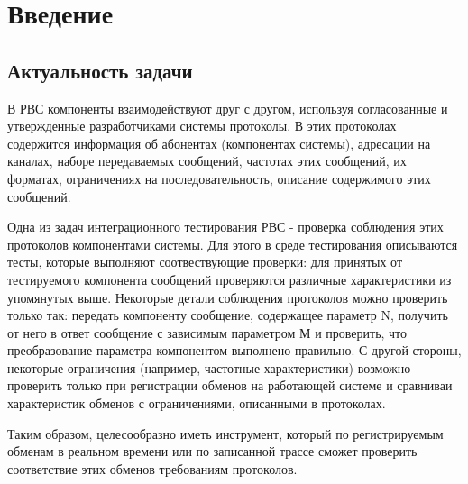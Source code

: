 \section{Введение}

\subsection{Актуальность задачи}


В РВС компоненты взаимодействуют друг с другом, используя согласованные и 
утвержденные разработчиками системы протоколы. В этих протоколах содержится 
информация об абонентах (компонентах системы), адресации на каналах, наборе 
передаваемых сообщений, частотах этих сообщений, их форматах, ограничениях на 
последовательность, описание содержимого этих сообщений.

Одна из задач интеграционного тестирования РВС - проверка соблюдения этих 
протоколов компонентами системы. Для этого в среде тестирования описываются 
тесты, которые выполняют соотвествующие проверки: для принятых от тестируемого 
компонента сообщений проверяются различные характеристики из упомянутых выше. 
Некоторые детали соблюдения протоколов можно проверить только так: передать 
компоненту сообщение, содержащее параметр N, получить от него в ответ сообщение 
с зависимым параметром М и проверить, что преобразование параметра компонентом 
выполнено правильно. С другой стороны, некоторые ограничения (например, 
частотные характеристики) возможно проверить только при регистрации обменов на 
работающей системе и сравниваи характеристик обменов с ограничениями, описанными 
в протоколах.

Таким образом, целесообразно иметь инструмент, который по регистрируемым обменам 
в реальном времени или по записанной трассе сможет проверить соответствие этих 
обменов требованиям протоколов.
